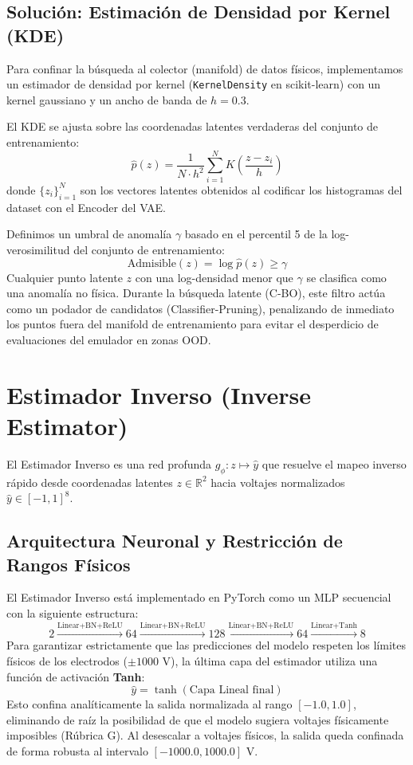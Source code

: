 \documentclass[12pt,letterpaper]{article}
\begin{document}
\subsection{Solución: Estimación de Densidad por Kernel (KDE)}
Para confinar la búsqueda al colector (manifold) de datos físicos, implementamos un estimador de densidad por kernel (\texttt{KernelDensity} en scikit-learn) con un kernel gaussiano y un ancho de banda de $h = 0.3$. 

El KDE se ajusta sobre las coordenadas latentes verdaderas del conjunto de entrenamiento:
\begin{equation}
    \hat{p}(z) = \frac{1}{N \cdot h^2} \sum_{i=1}^{N} K\left( \frac{z - z_i}{h} \right)
\end{equation}
donde $\{z_i\}_{i=1}^N$ son los vectores latentes obtenidos al codificar los histogramas del dataset con el Encoder del VAE.

Definimos un umbral de anomalía $\gamma$ basado en el percentil 5 de la log-verosimilitud del conjunto de entrenamiento:
\begin{equation}
    \text{Admisible}(z) = \log \hat{p}(z) \geq \gamma
\end{equation}
Cualquier punto latente $z$ con una log-densidad menor que $\gamma$ se clasifica como una anomalía no física. Durante la búsqueda latente (C-BO), este filtro actúa como un podador de candidatos (Classifier-Pruning), penalizando de inmediato los puntos fuera del manifold de entrenamiento para evitar el desperdicio de evaluaciones del emulador en zonas OOD.

\section{Estimador Inverso (Inverse Estimator)}
El Estimador Inverso es una red profunda $g_\phi: z \mapsto \hat{y}$ que resuelve el mapeo inverso rápido desde coordenadas latentes $z \in \mathbb{R}^2$ hacia voltajes normalizados $\hat{y} \in [-1, 1]^8$.

\subsection{Arquitectura Neuronal y Restricción de Rangos Físicos}
El Estimador Inverso está implementado en PyTorch como un MLP secuencial con la siguiente estructura:
\begin{equation}
    2 \xrightarrow{\text{Linear+BN+ReLU}} 64 \xrightarrow{\text{Linear+BN+ReLU}} 128 \xrightarrow{\text{Linear+BN+ReLU}} 64 \xrightarrow{\text{Linear+Tanh}} 8
\end{equation}
Para garantizar estrictamente que las predicciones del modelo respeten los límites físicos de los electrodos ($\pm 1000\text{ V}$), la última capa del estimador utiliza una función de activación \textbf{Tanh}:
\begin{equation}
    \hat{y} = \tanh(\text{Capa Lineal final})
\end{equation}
Esto confina analíticamente la salida normalizada al rango $[-1.0, 1.0]$, eliminando de raíz la posibilidad de que el modelo sugiera voltajes físicamente imposibles (Rúbrica G). Al desescalar a voltajes físicos, la salida queda confinada de forma robusta al intervalo $[-1000.0, 1000.0]\text{ V}$.
\end{document}
